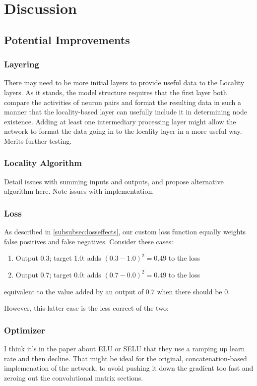 \chapter{Discussion}

\section{Potential Improvements}

\subsection{Layering}
There may need to be more initial layers to provide useful data to the Locality 
layers.  As it stands, the model structure requires that the first layer both 
compare the activities of neuron pairs and format the resulting data in such a 
manner that the locality-based layer can usefully include it in determining node 
existence.  Adding at least one intermediary processing layer might allow the 
network to format the data going in to the locality layer in a more useful way.  
Merits further testing.

\subsection{Locality Algorithm}
Detail issues with summing inputs and outputs, and propose alternative algorithm 
here. Note issues with implementation.

\subsection{Loss}
As described in \ref{subsubsec:losseffects}, our custom loss function equally 
weights false positives and false negatives. Consider these cases:

\begin{enumerate}
	\item Output 0.3; target 1.0: adds $(0.3-1.0)^2=0.49$ to the loss
	\item Output 0.7; target 0.0: adds $(0.7-0.0)^2=0.49$ to the loss
\end{enumerate}
equivalent to the value added by an output of 0.7 when there should be 0. 

However, this latter case is the less correct of the two: 

\subsection{Optimizer}
I think it's in the paper about ELU or SELU that they use a ramping up learn 
rate and then decline. That might be ideal for the original, concatenation-based 
implemenation of the network, to avoid pushing it down the gradient too fast and 
zeroing out the convolutional matrix sections.

